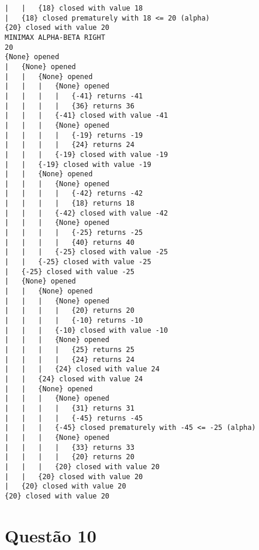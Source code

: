 \documentclass{article}
\begin{document}
\begin{verbatim}
|   |   {18} closed with value 18
|   {18} closed prematurely with 18 <= 20 (alpha)
{20} closed with value 20
MINIMAX ALPHA-BETA RIGHT
20
{None} opened
|   {None} opened
|   |   {None} opened
|   |   |   {None} opened
|   |   |   |   {-41} returns -41
|   |   |   |   {36} returns 36
|   |   |   {-41} closed with value -41
|   |   |   {None} opened
|   |   |   |   {-19} returns -19
|   |   |   |   {24} returns 24
|   |   |   {-19} closed with value -19
|   |   {-19} closed with value -19
|   |   {None} opened
|   |   |   {None} opened
|   |   |   |   {-42} returns -42
|   |   |   |   {18} returns 18
|   |   |   {-42} closed with value -42
|   |   |   {None} opened
|   |   |   |   {-25} returns -25
|   |   |   |   {40} returns 40
|   |   |   {-25} closed with value -25
|   |   {-25} closed with value -25
|   {-25} closed with value -25
|   {None} opened
|   |   {None} opened
|   |   |   {None} opened
|   |   |   |   {20} returns 20
|   |   |   |   {-10} returns -10
|   |   |   {-10} closed with value -10
|   |   |   {None} opened
|   |   |   |   {25} returns 25
|   |   |   |   {24} returns 24
|   |   |   {24} closed with value 24
|   |   {24} closed with value 24
|   |   {None} opened
|   |   |   {None} opened
|   |   |   |   {31} returns 31
|   |   |   |   {-45} returns -45
|   |   |   {-45} closed prematurely with -45 <= -25 (alpha)
|   |   |   {None} opened
|   |   |   |   {33} returns 33
|   |   |   |   {20} returns 20
|   |   |   {20} closed with value 20
|   |   {20} closed with value 20
|   {20} closed with value 20
{20} closed with value 20
\end{verbatim}

\newpage

\section{Questão 10}
\end{document}
